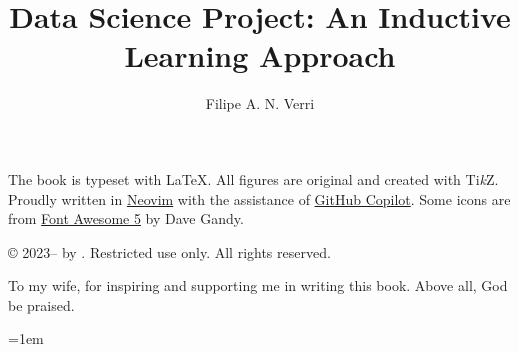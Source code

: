 \documentclass[oneside,a4paper,10pt]{book}
\begin{document}
\newcommand{\code}[1]{\texttt{#1}}
\newtheorem{definition}{Definition}[chapter]
\renewcommand{\vec}[1]{\mathbf{#1}}

\title{Data Science Project: An Inductive Learning Approach}
\author{Filipe A. N. Verri}

\frontmatter

\maketitle

The book is typeset with \LaTeX{}.  All figures are
original and created with Ti\textit{k}Z.  Proudly written in
\href{https://neovim.io/}{Neovim} with the assistance of
\href{https://github.com/features/copilot}{GitHub Copilot}.
Some icons are from \href{https://fontawesome.com/}{Font Awesome 5} by Dave Gandy.

\thetitle{} © 2023--\the\year{} by \theauthor{}.
Restricted use only.  All rights reserved.

  To my wife, for inspiring and supporting me in writing this book.
  Above all, God be praised.

\newpage

\tableofcontents




\mainmatter









\appendix


\backmatter
\emergencystretch=1em
\printbibliography
\printglossary
\end{document}
